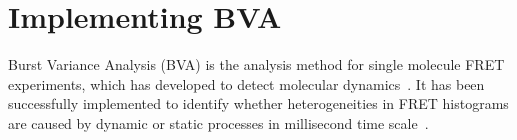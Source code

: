 \section{Implementing BVA}


Burst Variance Analysis (BVA) is the analysis method for single molecule FRET experiments, which has developed to detect molecular dynamics~\cite{Torella_2011}. It has been successfully implemented to identify whether heterogeneities in FRET histograms are caused by dynamic or static processes in millisecond time scale~\cite{Torella_2011}\cite{Robb_2013}.